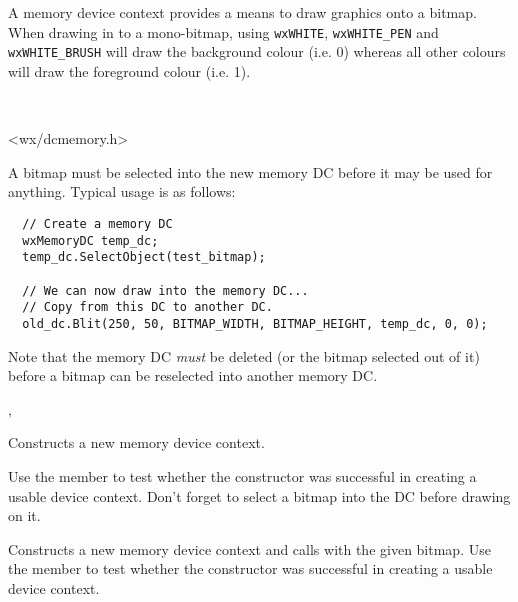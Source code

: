 \section{}\label{wxmemorydc}

A memory device context provides a means to draw graphics onto a bitmap. When
drawing in to a mono-bitmap, using {\tt wxWHITE}, {\tt wxWHITE\_PEN} and
{\tt wxWHITE\_BRUSH}
will draw the background colour (i.e. 0) whereas all other colours will draw the
foreground colour (i.e. 1).


\\


<wx/dcmemory.h>


A bitmap must be selected into the new memory DC before it may be used
for anything.  Typical usage is as follows:

\begin{verbatim}
  // Create a memory DC
  wxMemoryDC temp_dc;
  temp_dc.SelectObject(test_bitmap);

  // We can now draw into the memory DC...
  // Copy from this DC to another DC.
  old_dc.Blit(250, 50, BITMAP_WIDTH, BITMAP_HEIGHT, temp_dc, 0, 0);
\end{verbatim}

Note that the memory DC {\it must} be deleted (or the bitmap selected out of it) before a bitmap
can be reselected into another memory DC.


, 


\label{wxmemorydcctor}


Constructs a new memory device context.

Use the  member to test whether the constructor was successful
in creating a usable device context.
Don't forget to select a bitmap into the DC before drawing on it.


Constructs a new memory device context and calls 
with the given bitmap.
Use the  member to test whether the constructor was successful
in creating a usable device context.


